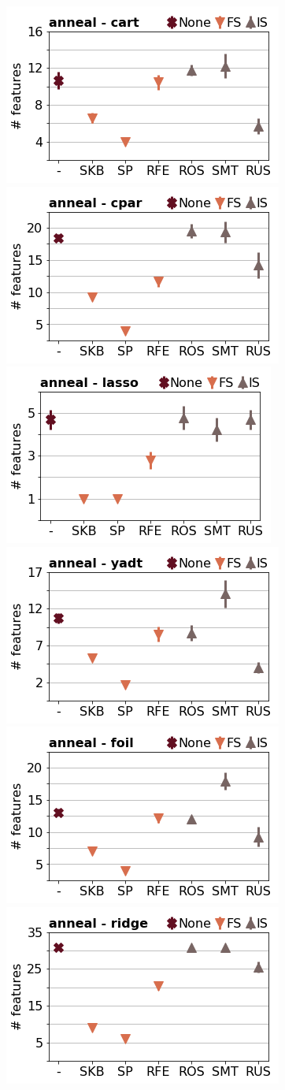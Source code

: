 \documentclass[runningheads,a4paper]{llncs}
\begin{document}
\begin{figure}[!h]
\includegraphics[width=0.32\linewidth]{fig/preps_anneal_DT_sklearn_nbr_features.png}
\includegraphics[width=0.32\linewidth]{fig/preps_anneal_RB_cpar_nbr_features.png}
\includegraphics[width=0.32\linewidth]{fig/preps_anneal_LM_lasso_nbr_features.png}
\includegraphics[width=0.32\linewidth]{fig/preps_anneal_DT_yadt_nbr_features.png}
\includegraphics[width=0.32\linewidth]{fig/preps_anneal_RB_foil_nbr_features.png}
\includegraphics[width=0.32\linewidth]{fig/preps_anneal_LM_ridge_nbr_features.png}
\end{figure}
\end{document}
